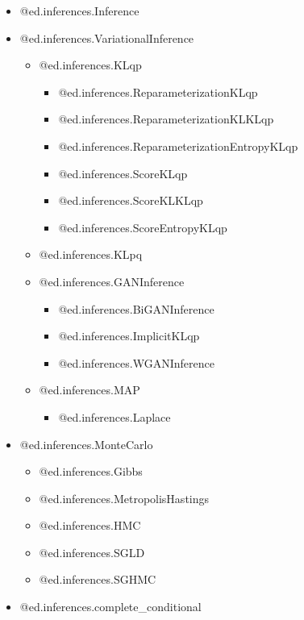 \begin{itemize}
  \item @{ed.inferences.Inference}
  \item @{ed.inferences.VariationalInference}
    \begin{itemize}
    \item @{ed.inferences.KLqp}
      \begin{itemize}
      \item @{ed.inferences.ReparameterizationKLqp}
      \item @{ed.inferences.ReparameterizationKLKLqp}
      \item @{ed.inferences.ReparameterizationEntropyKLqp}
      \item @{ed.inferences.ScoreKLqp}
      \item @{ed.inferences.ScoreKLKLqp}
      \item @{ed.inferences.ScoreEntropyKLqp}
      \end{itemize}
    \item @{ed.inferences.KLpq}
    \item @{ed.inferences.GANInference}
      \begin{itemize}
      \item @{ed.inferences.BiGANInference}
      \item @{ed.inferences.ImplicitKLqp}
      \item @{ed.inferences.WGANInference}
      \end{itemize}
    \item @{ed.inferences.MAP}
      \begin{itemize}
      \item @{ed.inferences.Laplace}
      \end{itemize}
    \end{itemize}
  \item @{ed.inferences.MonteCarlo}
    \begin{itemize}
    \item @{ed.inferences.Gibbs}
    \item @{ed.inferences.MetropolisHastings}
    \item @{ed.inferences.HMC}
    \item @{ed.inferences.SGLD}
    \item @{ed.inferences.SGHMC}
    \end{itemize}
  \item @{ed.inferences.complete_conditional}
\end{itemize}
